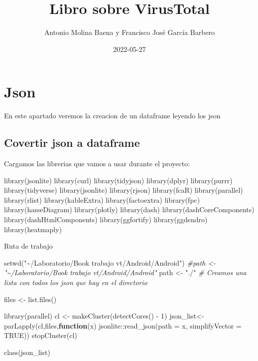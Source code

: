 \documentclass[
]{book}
\title{Libro sobre VirusTotal}
\author{Antonio Molina Baena y Francisco José García Barbero}
\date{2022-05-27}
\newenvironment{Shaded}{\begin{snugshade}}{\end{snugshade}}
\newcommand{\AttributeTok}[1]{\textcolor[rgb]{0.77,0.63,0.00}{#1}}
\newcommand{\CommentTok}[1]{\textcolor[rgb]{0.56,0.35,0.01}{\textit{#1}}}
\newcommand{\ConstantTok}[1]{\textcolor[rgb]{0.00,0.00,0.00}{#1}}
\newcommand{\ControlFlowTok}[1]{\textcolor[rgb]{0.13,0.29,0.53}{\textbf{#1}}}
\newcommand{\DecValTok}[1]{\textcolor[rgb]{0.00,0.00,0.81}{#1}}
\newcommand{\FunctionTok}[1]{\textcolor[rgb]{0.00,0.00,0.00}{#1}}
\newcommand{\NormalTok}[1]{#1}
\newcommand{\OtherTok}[1]{\textcolor[rgb]{0.56,0.35,0.01}{#1}}
\newcommand{\SpecialCharTok}[1]{\textcolor[rgb]{0.00,0.00,0.00}{#1}}
\newcommand{\StringTok}[1]{\textcolor[rgb]{0.31,0.60,0.02}{#1}}
\begin{document}
\maketitle

{
\setcounter{tocdepth}{1}
\tableofcontents
}
\hypertarget{json}{%
\chapter{Json}\label{json}}

En este apartado veremos la creacion de un dataframe leyendo los json

\hypertarget{covertir-json-a-dataframe}{%
\section{Covertir json a dataframe}\label{covertir-json-a-dataframe}}

Cargamos las librerias que vamos a usar durante el proyecto:

library(jsonlite)
library(curl)
library(tidyjson)
library(dplyr)
library(purrr)
library(tidyverse)
library(jsonlite)
library(rjson)
library(fcaR)
library(parallel)
library(rlist)
library(kableExtra)
library(factoextra)
library(fpc)
library(hasseDiagram)
library(plotly)
library(dash)
library(dashCoreComponents)
library(dashHtmlComponents)
library(ggfortify)
library(ggdendro)
library(heatmaply)

Ruta de trabajo

\begin{Shaded}
\begin{Highlighting}[]
\FunctionTok{setwd}\NormalTok{(}\StringTok{"\textasciitilde{}/Laboratorio/Book trabajo vt/Android/Android"}\NormalTok{)}
\CommentTok{\#path \textless{}{-} "\textasciitilde{}/Laboratorio/Book trabajo vt/Android/Android"}
\NormalTok{path }\OtherTok{\textless{}{-}} \StringTok{"./"}
\CommentTok{\# Creamos una lista con todos los json que hay en el directorio}

\NormalTok{files }\OtherTok{\textless{}{-}} \FunctionTok{list.files}\NormalTok{()}

\FunctionTok{library}\NormalTok{(parallel)}
\NormalTok{cl }\OtherTok{\textless{}{-}} \FunctionTok{makeCluster}\NormalTok{(}\FunctionTok{detectCores}\NormalTok{() }\SpecialCharTok{{-}} \DecValTok{1}\NormalTok{)}
\NormalTok{json\_list}\OtherTok{\textless{}{-}}\FunctionTok{parLapply}\NormalTok{(cl,files,}\ControlFlowTok{function}\NormalTok{(x) jsonlite}\SpecialCharTok{::}\FunctionTok{read\_json}\NormalTok{(}\AttributeTok{path =}\NormalTok{ x, }\AttributeTok{simplifyVector =} \ConstantTok{TRUE}\NormalTok{))}
\FunctionTok{stopCluster}\NormalTok{(cl)}

\FunctionTok{class}\NormalTok{(json\_list)}
\end{Highlighting}
\end{Shaded}
\end{document}
